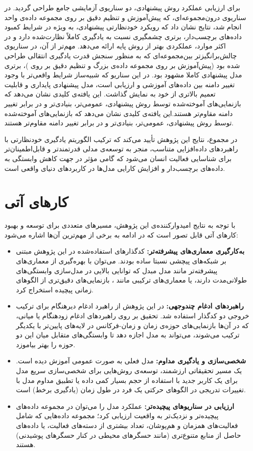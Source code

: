 برای ارزیابی عملکرد روش پیشنهادی، دو سناریوی آزمایشی جامع طراحی گردید. در سناریوی درون‌مجموعه‌ای، که پیش‌آموزش و تنظیم دقیق بر روی مجموعه داده‌ی واحد  انجام شد، نتایج نشان داد که رویکرد خودنظارتی پیشنهادی، به ویژه در شرایط کمبود داده‌های برچسب‌دار، برتری چشمگیری نسبت به یادگیری کاملاً نظارت‌شده دارد و در اکثر موارد، عملکردی بهتر از روش پایه ارائه می‌دهد. مهم‌تر از آن، در سناریوی چالش‌برانگیزتر بین‌مجموعه‌ای که به منظور سنجش قدرت یادگیری انتقالی طراحی شده بود (پیش‌آموزش بر روی مجموعه داده‌ی بزرگ  و تنظیم دقیق بر روی )، برتری مدل پیشنهادی کاملا مشهود بود. در این سناریو که شبیه‌ساز شرایط واقعی‌تر با وجود تغییر دامنه بین داده‌های آموزشی و ارزیابی است، مدل پیشنهادی پایداری و قابلیت تعمیم بالاتری از خود به نمایش گذاشت. این یافته‌ی کلیدی نشان می‌دهد که بازنمایی‌های آموخته‌شده توسط روش پیشنهادی، عمومی‌تر، بنیادی‌تر و در برابر تغییر دامنه مقاوم‌تر هستند.این یافته‌ی کلیدی نشان می‌دهد که بازنمایی‌های آموخته‌شده توسط روش پیشنهادی، عمومی‌تر، بنیادی‌تر و در برابر تغییر دامنه مقاوم‌تر هستند.

در مجموع، نتایج این پژوهش تأیید می‌کند که ترکیب الگوریتم یادگیری خودنظارتی  با راهبردهای داده‌افزایی متناسب، منجر به توسعه‌ی مدلی قدرتمندتر و قابل‌اطمینان‌تر برای شناسایی فعالیت انسان می‌شود که گامی مؤثر در جهت کاهش وابستگی به داده‌های برچسب‌دار و افزایش کارایی مدل‌ها در کاربردهای دنیای واقعی است.

\section{کارهای آتی}

با توجه به نتایج امیدوارکننده‌ی این پژوهش، مسیرهای متعددی برای توسعه و بهبود کارهای آتی قابل تصور است که در ادامه به برخی از مهم‌ترین آن‌ها اشاره می‌شود:
\begin{itemize}
    \item \textbf{به‌کارگیری معماری‌های پیشرفته‌تر:} کدگذار‌های استفاده‌شده در این پژوهش مبتنی بر شبکه‌های پیچشی نسبتا ساده بودند. می‌توان با بهره‌گیری از معماری‌های پیشرفته‌تر مانند مدل مبدل که توانایی بالایی در مدل‌سازی وابستگی‌های طولانی‌مدت دارند، یا معماری‌های ترکیبی مانند ، بازنمایی‌های دقیق‌تری از الگوهای زمانی پیچیده استخراج کرد.
    \item \textbf{راهبردهای ادغام چندوجهی:} در این پژوهش از راهبرد ادغام دیرهنگام برای ترکیب خروجی دو کدگذار استفاده شد. تحقیق بر روی راهبردهای ادغام زودهنگام یا میانی، که در آن‌ها بازنمایی‌های حوزه‌ی زمان و زمان-فرکانس در لایه‌های پایین‌تر با یکدیگر ترکیب می‌شوند، می‌تواند به مدل اجازه دهد تا وابستگی‌های متقابل میان این دو حوزه را بهتر بیاموزد.
    \item \textbf{شخصی‌سازی و یادگیری مداوم:} مدل فعلی به صورت عمومی آموزش دیده است. یک مسیر تحقیقاتی ارزشمند، توسعه‌ی روش‌هایی برای شخصی‌سازی سریع مدل برای یک کاربر جدید با استفاده از حجم بسیار کمی داده یا تطبیق مداوم مدل با تغییرات تدریجی در الگوهای حرکتی یک فرد در طول زمان (یادگیری برخط) است.
    \item \textbf{ارزیابی در سناریوهای پیچیده‌تر:} عملکرد مدل را می‌توان در مجموعه داده‌های پیچیده‌تر و نزدیک‌تر به واقعیت ارزیابی کرد؛ مجموعه داده‌هایی که شامل فعالیت‌های همزمان و هم‌پوشان، تعداد بیشتری از دسته‌های فعالیت، یا داده‌های حاصل از منابع متنوع‌تری (مانند حسگرهای محیطی در کنار حسگرهای پوشیدنی) هستند.
\end{itemize}
